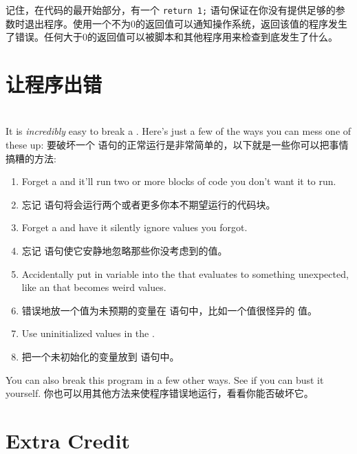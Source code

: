 记住，在代码的最开始部分，有一个 \verb|return 1;| 语句保证在你没有提供足够的参数时退出程序。使用一个不为0的返回值可以通知操作系统，返回该值的程序发生了错误。任何大于0的返回值可以被脚本和其他程序用来检查到底发生了什么。

\section{让程序出错}
\section{}
It is \emph{incredibly} easy to break a .
Here's just a few of the ways you can mess one of these up:
要破坏一个  语句的正常运行是非常简单的，以下就是一些你可以把事情搞糟的方法:
\begin{enumerate}
\item Forget a  and it'll run two or more
    blocks of code you don't want it to run.
\item 忘记  语句将会运行两个或者更多你本不期望运行的代码块。
\item Forget a  and have it silently
    ignore values you forgot.
\item 忘记  语句使它安静地忽略那些你没考虑到的值。
\item Accidentally put in variable into the  that
    evaluates to something unexpected, like an 
    that becomes weird values.
\item 错误地放一个值为未预期的变量在  语句中，比如一个值很怪异的  值。
\item Use uninitialized values in the .
\item 把一个未初始化的变量放到  语句中。
\end{enumerate}

You can also break this program in a few other ways.  See if you
can bust it yourself.
你也可以用其他方法来使程序错误地运行，看看你能否破坏它。
\section{Extra Credit}
